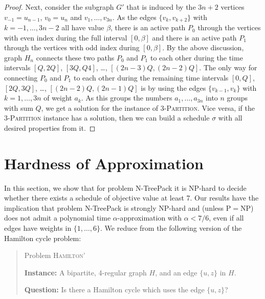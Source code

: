 \documentclass[runningheads]{llncs}
\newcommand{\set}[1]{\{ #1 \}}
\newcommand{\fromto}[2]{\set{#1, \ldots, #2}}
\newcommand{\xxxNTP}{{\sc N-TreePack}}
\begin{document}
\begin{proof}
Next, consider the subgraph $G'$ that is induced by the $3n+2$ vertices $v_{-1}=u_{n-1}$, $v_0=u_n$ and 
$v_1,\ldots,v_{3n}$.
As the edges $\{v_k, v_{k+2}\}$ with $k=-1,\ldots,3n-2$ all have value $\beta$, there is an active path $P_0$ 
through the vertices with even index during the full interval $[0,\beta]$ and there is an active 
path $P_1$ through the vertices with odd index during $[0, \beta]$.
By the above discussion, graph $H_n$ connects these two paths $P_0$ and $P_1$ to each other during the
time intervals $[Q,2Q]$, $[3Q,Q4]$, \dots, $[(2n-3)Q,(2n-2)Q]$.
The only way for connecting $P_0$ and $P_1$ to each other during the remaining time intervals 
$[0,Q]$, $[2Q,3Q]$, \dots, $[(2n-2)Q,(2n-1)Q]$ is by using the edges $\{v_{k-1},v_k\}$ with $k=1,\ldots,3n$ of 
weight $a_k$.
As this groups the numbers $a_1,\ldots,a_{3n}$ into $n$ groups with sum $Q$, we get a solution
for the instance of \textsc{3-Partition}.
Vice versa, if the \textsc{3-Partition} instance has a solution, then we can build a schedule $\sigma$
with all desired properties from it.
\end{proof}

\section{Hardness of Approximation}
\label{sec:inapprox}

In this section, we show that for problem {\xxxNTP} it is NP-hard to decide whether there exists a schedule of objective value at least 7. Our results have the implication that problem {\xxxNTP} is strongly NP-hard and (unless P$=$NP) does not admit a polynomial time $\alpha$-approximation with $\alpha < 7/6$, even if all edges have weights in $\fromto{1}{6}$. 
We reduce from the following version of the Hamilton cycle problem:

\begin{quote}

Problem \textsc{Hamilton'} 

\textbf{Instance:} A bipartite, 4-regular graph $H$, and an edge $\set{u, z}$ in $H$.

\textbf{Question:} Is there a Hamilton cycle which uses the edge $\set{u, z}$?

\end{quote}
\end{document}
